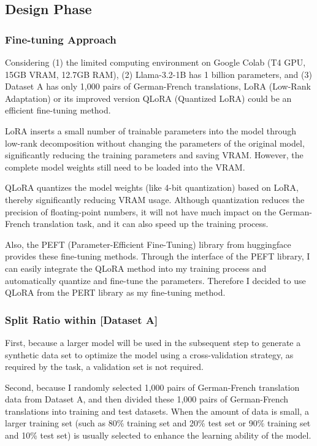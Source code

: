 \subsection{Design Phase}
\label{subsec:design}

\subsubsection{Fine-tuning Approach}
Considering
(1) the limited computing environment on Google Colab (T4 GPU, 15GB VRAM, 12.7GB RAM), 
(2) Llama-3.2-1B has 1 billion parameters, and 
(3) Dataset A has only 1,000 pairs of German-French translations,
LoRA (Low-Rank Adaptation) \cite{hu2021lora} or its improved version 
QLoRA (Quantized LoRA) \cite{dettmers2023qlora} could be an efficient fine-tuning method.

LoRA inserts a small number of trainable parameters into the model 
through low-rank decomposition without changing the parameters of the original model, 
significantly reducing the training parameters and saving VRAM. 
However, the complete model weights still need to be loaded into the VRAM.

QLoRA quantizes the model weights (like 4-bit quantization) based on LoRA, 
thereby significantly reducing VRAM usage.
Although quantization reduces the precision of floating-point numbers, 
it will not have much impact on the German-French translation task, 
and it can also speed up the training process.

Also, the PEFT (Parameter-Efficient Fine-Tuning) library \cite{peft} from huggingface provides these fine-tuning methods.
Through the interface of the PEFT library, 
I can easily integrate the QLoRA method into my training process and automatically quantize and fine-tune the parameters.
Therefore I decided to use QLoRA from the PERT library as my fine-tuning method.

\subsubsection{Split Ratio within [Dataset A]}
First, because a larger model will be used in the subsequent step to 
generate a synthetic data set to optimize the model using a cross-validation strategy, 
as required by the task, a validation set is not required.

Second, because I randomly selected 1,000 pairs of German-French translation data from Dataset A, 
and then divided these 1,000 pairs of German-French translations into training and test datasets. 
When the amount of data is small, a larger training set 
(such as 80\% training set and 20\% test set or 90\% training set and 10\% test set) 
is usually selected to enhance the learning ability of the model.

